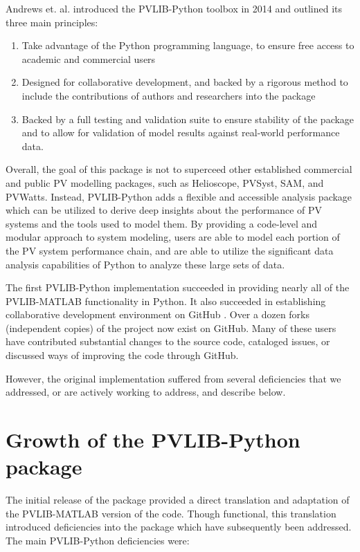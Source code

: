 \documentclass[conference]{IEEEtran}
\begin{document}
Andrews et. al. \cite{andrews} introduced the PVLIB-Python toolbox in 2014 and outlined its three main principles:

\begin{enumerate}
\item Take advantage of the Python programming language, to ensure free access to academic and commercial users
\item Designed for collaborative development, and backed by a rigorous method to include the contributions of authors and researchers into the package
\item Backed by a full testing and validation suite to ensure stability of the package and to allow for validation of model results against real-world performance data.
\end{enumerate}

Overall, the goal of this package is not to superceed other established commercial and public PV modelling packages, such as Helioscope, PVSyst, SAM, and PVWatts. 
Instead, PVLIB-Python adds a flexible and accessible analysis package which can be utilized to derive deep insights about the performance of PV systems and the tools used to model them.
By providing a code-level and modular approach to system modeling, users are able to model each portion of the PV system performance chain, and are able to utilize the significant data analysis capabilities of Python to analyze these large sets of data. 

The first PVLIB-Python implementation succeeded in providing nearly all of the PVLIB-MATLAB functionality in Python.
It also succeeded in establishing collaborative development environment on GitHub \cite{pvlib-github}. 
Over a dozen forks (independent copies) of the project now exist on GitHub. 
Many of these users have contributed substantial changes to the source code, cataloged issues, or discussed ways of improving the code through GitHub.

However, the original implementation suffered from several deficiencies that we addressed, or are actively working to address, and describe below. 



\section{Growth of the PVLIB-Python package}

The initial release of the package provided a direct translation and adaptation of the PVLIB-MATLAB version of the code. Though functional, this translation introduced deficiencies into the package which have subsequently been addressed. The main PVLIB-Python deficiencies were:
\end{document}
